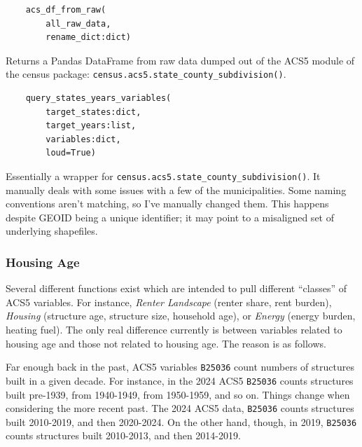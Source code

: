 \documentclass{article}
\newcommand{\red}[1]{{\color{red}{#1}}}
\begin{document}
\begin{verbatim}
    acs_df_from_raw(
        all_raw_data, 
        rename_dict:dict)
\end{verbatim}
Returns a Pandas DataFrame from raw data dumped out of the ACS5 module of the census package: 
\verb|census.acs5.state_county_subdivision()|.



\begin{verbatim}
    query_states_years_variables(
        target_states:dict, 
        target_years:list, 
        variables:dict, 
        loud=True)
\end{verbatim}
Essentially a wrapper for \verb|census.acs5.state_county_subdivision()|.
It manually deals with some issues with a few of the municipalities.
Some naming conventions aren't matching, so I've manually changed them.
This happens despite GEOID being a unique identifier;
it may point to a misaligned set of underlying shapefiles.
\red{This requires further investigation.}

\subsubsection*{Housing Age}
Several different functions exist which are intended to pull different ``classes'' of ACS5 variables.
For instance, \textit{Renter Landscape} (renter share, rent burden), \textit{Housing} 
(structure age, structure size, household age), or \textit{Energy} (energy burden, heating fuel).
The only real difference currently is between variables related to housing age and those not related
to housing age.
The reason is as follows.

Far enough back in the past, ACS5 variables \verb|B25036| count numbers of structures built in a given decade.
For instance, in the 2024 ACS5 \verb|B25036| counts structures built pre-1939,
from 1940-1949, from 1950-1959, and so on.
Things change when considering the more recent past.
The 2024 ACS5 data, \verb|B25036| counts structures built 2010-2019, and then 2020-2024.
On the other hand, though, in 2019, \verb|B25036| counts structures built 
2010-2013, and then 2014-2019.
\end{document}
